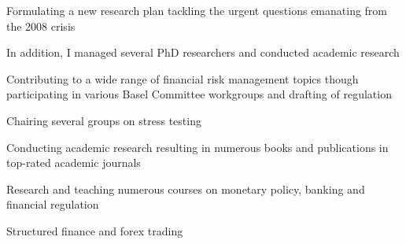 \documentclass[]{deedy-resume-reversed}
\begin{document}
\begin{minipage}[t]{0.60\textwidth}
 \hspace{\fill}
\begin{tightemize}
\item Formulating a new research plan tackling the urgent questions emanating from the 2008 crisis
\item In addition, I managed several PhD researchers and conducted academic research
\end{tightemize}
\sectionsep

 \hspace{\fill}
\begin{tightemize}
\item Contributing to a wide range of financial risk management topics though participating in various Basel Committee workgroups and drafting of regulation
\item Chairing several groups on stress testing
\item Conducting academic research resulting in numerous books and publications in top-rated academic journals
\end{tightemize}
\sectionsep

 \hspace{\fill}
\begin{tightemize}
\item Research and teaching numerous courses on monetary policy, banking and financial regulation
\end{tightemize}
\sectionsep

 \hspace{\fill}
\begin{tightemize}
\item Structured finance and forex trading
\end{tightemize}
\sectionsep





\end{minipage}
\end{document}
